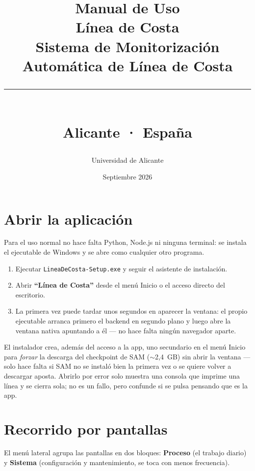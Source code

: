 \documentclass[12pt,a4paper,spanish]{article}
\title{%
  \vspace{-1.5cm}
  \textbf{\Huge Manual de Uso}\\[0.4cm]
  {\Large\textcolor{NavyBlue}{Línea de Costa}}\\[0.2cm]
  {\large Sistema de Monitorización Automática de Línea de Costa}\\[0.6cm]
  \rule{\linewidth}{1pt}\\[0.4cm]
  {\normalsize Alicante · España}
}
\author{Universidad de Alicante}
\date{Septiembre 2026}
\begin{document}

\maketitle
\thispagestyle{empty}


\newpage
\tableofcontents

\newpage
\section{Abrir la aplicación}

Para el uso normal no hace falta Python, Node.js ni ninguna terminal: se instala el ejecutable
de Windows y se abre como cualquier otro programa.

\begin{enumerate}[leftmargin=1.5em]
  \item Ejecutar \texttt{LineaDeCosta-Setup.exe} y seguir el asistente de instalación.
  \item Abrir \textbf{``Línea de Costa''} desde el menú Inicio o el acceso directo del
        escritorio.
  \item La primera vez puede tardar unos segundos en aparecer la ventana: el propio ejecutable
        arranca primero el backend en segundo plano y luego abre la ventana nativa apuntando a
        él — no hace falta ningún navegador aparte.
\end{enumerate}

\begin{warnbox}
El instalador crea, además del acceso a la app, uno secundario en el menú Inicio para
\emph{forzar} la descarga del checkpoint de SAM ($\sim$2,4~GB) sin abrir la ventana — solo hace
falta si SAM no se instaló bien la primera vez o se quiere volver a descargar aposta. Abrirlo por
error solo muestra una consola que imprime una línea y se cierra sola; no es un fallo, pero
confunde si se pulsa pensando que es la app.
\end{warnbox}
\newpage
\section{Recorrido por pantallas}

El menú lateral agrupa las pantallas en dos bloques: \textbf{Proceso} (el trabajo diario) y
\textbf{Sistema} (configuración y mantenimiento, se toca con menos frecuencia).
\end{document}
